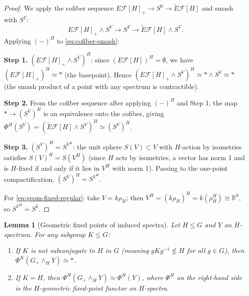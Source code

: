 \documentclass[12pt]{article}
\newtheorem{lemma}[theorem]{Lemma}
\theoremstyle{definition}
\begin{document}
\begin{proof}
We apply the cofiber sequence $E\mathcal{F}[H]_+ \to S^0 \to \widetilde{E}\mathcal{F}[H]$
and smash with $S^V$:
\begin{equation}
\label{eq:cofiber-smash}
  E\mathcal{F}[H]_+ \wedge S^V \longrightarrow S^V
  \longrightarrow \widetilde{E}\mathcal{F}[H] \wedge S^V.
\end{equation}
Applying $(-)^H$ to \eqref{eq:cofiber-smash}:

\textbf{Step 1.} $(E\mathcal{F}[H]_+ \wedge S^V)^H$: since $(E\mathcal{F}[H])^H = \emptyset$,
we have $(E\mathcal{F}[H]_+)^H \simeq *$ (the basepoint). Hence
$(E\mathcal{F}[H]_+ \wedge S^V)^H \simeq * \wedge S^V \simeq *$
(the smash product of a point with any spectrum is contractible).

\textbf{Step 2.} From the cofiber sequence after applying $(-)^H$ and Step 1, the map
$* \to (S^V)^H$ is an equivalence onto the cofiber, giving
$\Phi^H(S^V) = (\widetilde{E}\mathcal{F}[H] \wedge S^V)^H \simeq (S^V)^H$.

\textbf{Step 3.} $(S^V)^H = S^{V^H}$: the unit sphere $S(V) \subset V$ with $H$-action
by isometries satisfies $S(V)^H = S(V^H)$ (since $H$ acts by isometries, a vector has
norm 1 and is $H$-fixed if and only if it lies in $V^H$ with norm 1). Passing to the
one-point compactification, $(S^V)^H = S^{V^H}$.

For \eqref{eq:geom-fixed-regular}: take $V = k\rho_H$; then $V^H = (k\rho_H)^H =
k(\rho_H^H) \cong \mathbb{R}^k$, so $S^{V^H} = S^k$.
\end{proof}

\begin{lemma}[Geometric fixed points of induced spectra]
\label{lem:geom-fixed-induced}
Let $H \leq G$ and $Y$ an $H$-spectrum. For any subgroup $K \leq G$:
\begin{enumerate}
\item[\textup{(i)}] If $K$ is not subconjugate to $H$ in $G$ (meaning $gKg^{-1} \not\leq H$
  for all $g \in G$), then $\Phi^K(G_+ \wedge_H Y) \simeq *$.
\item[\textup{(ii)}] If $K = H$, then $\Phi^H(G_+ \wedge_H Y) \simeq \Phi^H(Y)$,
  where $\Phi^H$ on the right-hand side is the $H$-geometric fixed-point functor on
  $H$-spectra.
\end{enumerate}
\end{lemma}
\end{document}
